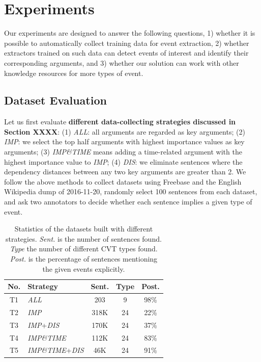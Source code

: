 \section{Experiments}
Our experiments are designed to answer the following questions,
1) whether it is possible to automatically collect training data for event extraction,
2) whether  extractors trained on such data can detect events of interest and identify
their corresponding arguments,
and 3) whether our solution can work with other knowledge resources for more types of event.

 \subsection{Dataset Evaluation}\label{sec:evalhypo}
Let us first evaluate \textbf{different data-collecting strategies discussed in Section XXXX}:
(1) \emph{ALL}: all arguments are regarded as key arguments; (2) \emph{IMP}: we select the top half arguments with highest importance values as key arguments; (3) \emph{IMP\&TIME} means adding a time-related argument with the highest importance value to %
\emph{IMP}; (4) \emph{DIS}: we eliminate sentences where the dependency distances between any two key arguments are greater than 2.
We follow the above methods to collect datasets using Freebase and the English Wikipedia dump of 2016-11-20,
randomly select 100 sentences from each dataset, and ask two annotators to decide whether each sentence implies a given type of event.




\begin{table}[h]
\small
\centering
\begin{tabular}{|c|l|c|c|c|} \hline
	No. & Strategy & Sent. & Type & Post. \\ \hline
	T1 & \emph{ALL} & 203 & 9 & 98\% \\ \hline
	T2 & \emph{IMP} & 318K & 24 & 22\% \\ \hline
	T3 & \emph{IMP}+\emph{DIS} & 170K & 24 & 37\% \\ \hline
	T4 & \emph{IMP\&TIME} & 112K & 24 & 83\% \\ \hline
	T5 & \emph{IMP\&TIME}+\emph{DIS} & 46K & 24 & 91\% \\ \hline
\end{tabular}
\caption{Statistics of the datasets built with different strategies.
\textit{Sent.} is the number of sentences found. \textit{Type} the number of different CVT types found.  \textit{Post.} is the percentage of sentences mentioning the given events explicitly.\label{tab:3}}
\end{table}

